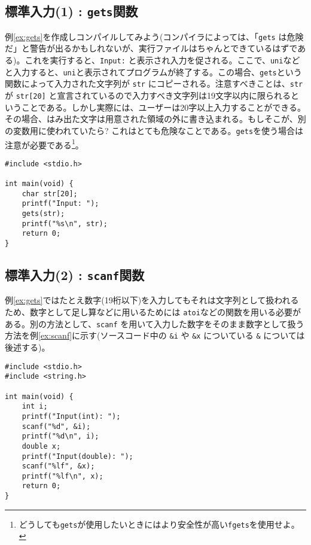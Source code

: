 \subsection{標準入力(1) : \texttt{gets}関数}
例\ref{ex:gets}を作成しコンパイルしてみよう(コンパイラによっては、「\texttt{gets} は危険だ」と警告が出るかもしれないが、実行ファイルはちゃんとできているはずである)。これを実行すると、\texttt{Input:} と表示され入力を促される。ここで、\texttt{uni}などと入力すると、\texttt{uni}と表示されてプログラムが終了する。この場合、\texttt{gets}という関数によって入力された文字列が \texttt{str} にコピーされる。注意すべきことは、\texttt{str} が \texttt{str[20]} と宣言されているので入力すべき文字列は19文字以内に限られるということである。しかし実際には、ユーザーは20字以上入力することができる。その場合、はみ出た文字は用意された領域の外に書き込まれる。もしそこが、別の変数用に使われていたら? これはとても危険なことである。\texttt{gets}を使う場合は注意が必要である\footnote{どうしても\texttt{gets}が使用したいときにはより安全性が高い\texttt{fgets}を使用せよ。}。
\begin{reidai}\label{ex:gets}
    \begin{verbatim}
#include <stdio.h>

int main(void) {
    char str[20];
    printf("Input: ");
    gets(str);
    printf("%s\n", str);
    return 0;
}
\end{verbatim}
\end{reidai}

\subsection{標準入力(2) : \texttt{scanf}関数}
例\ref{ex:gets}ではたとえ数字(19桁以下)を入力してもそれは文字列として扱われるため、数字として足し算などに用いるためには \texttt{atoi}などの関数を用いる必要がある。別の方法として、\texttt{scanf} を用いて入力した数字をそのまま数字として扱う方法を例\ref{ex:scanf}に示す(ソースコード中の \texttt{\&i} や \texttt{\&x} についている \texttt{\&} については後述する)。
\begin{reidai}\label{ex:scanf}
    \begin{verbatim}
#include <stdio.h>
#include <string.h>

int main(void) {
    int i;
    printf("Input(int): ");
    scanf("%d", &i);
    printf("%d\n", i);
    double x;
    printf("Input(double): ");
    scanf("%lf", &x);
    printf("%lf\n", x);
    return 0;
}
\end{verbatim}
\end{reidai}

